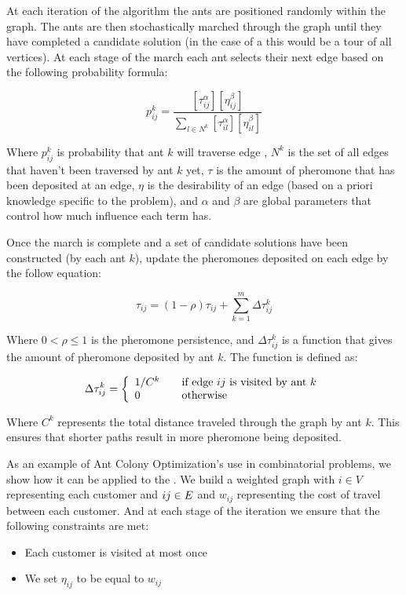 At each iteration of the algorithm the ants are positioned randomly within the graph. The ants are then stochastically marched through the graph until they have completed a candidate solution (in the case of a \TSP this would be a tour of all vertices). At each stage of the march each ant selects their next edge based on the following probability formula:

\[
   p_{ij}^k = \frac{ [\tau_{ij}^{\alpha}] [\eta_{ij}^{\beta}] }{ \sum_{l \in N^k} [\tau_{il}^{\alpha}] [\eta_{il}^{\beta}] }
\]

Where $p_{ij}^k$ is probability that ant $k$ will traverse edge , $N^k$ is the set of all edges that haven't been traversed by ant $k$ yet, $\tau$ is the amount of pheromone that has been deposited at an edge, $\eta$ is the desirability of an edge (based on a priori knowledge specific to the problem), and $\alpha$ and $\beta$ are global parameters that control how much influence each term has.

Once the march is complete and a set of candidate solutions have been constructed (by each ant $k$), update the pheromones deposited on each edge by the follow equation:

\[
   \tau_{ij} = (1 - \rho) \tau_{ij} + \sum_{k=1}^m \Delta \tau_{ij}^k
\]

Where $0 < \rho \le 1$ is the pheromone persistence, and $\Delta \tau_{ij}^k$ is a function that gives the amount of pheromone deposited by ant $k$. The function is defined as:

\[
   \Delta \tau_{ij}^k = \left\{
   \begin{array}{l l}
     1 / C^k & \quad \text{if edge $ij$ is visited by ant $k$} \\
     0       & \quad \text{otherwise} \\
   \end{array} \right.
\]

Where $C^k$ represents the total distance traveled through the graph by ant $k$. This ensures that shorter paths result in more pheromone being deposited.

As an example of Ant Colony Optimization's use in combinatorial problems, we show how it can be applied to the \TSP. We build a weighted graph with $i \in V$ representing each customer and $ij \in E$ and $w_{ij}$ representing the cost of travel between each customer. And at each stage of the iteration we ensure that the following constraints are met:

\begin{itemize}
   \item Each customer is visited at most once
   \item We set $\eta_{ij}$ to be equal to $w_{ij}$
\end{itemize}

